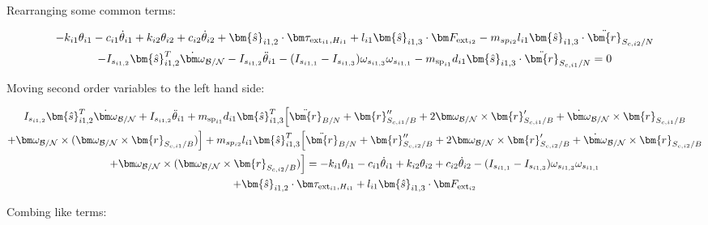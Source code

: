 Rearranging some common terms:

\begin{multline}
	-k_{i1} \theta_{i1} - c_{i1} \dot{\theta}_{i1} + k_{i2} \theta_{i2} + c_{i2} \dot{\theta}_{i2} + \bm{\hat{s}}_{i1,2} \cdot \bm \tau_{\text{ext}_{i1},H_{i1}}  + l_{i1} \bm{\hat{s}}_{i1,3} \cdot \bm F_{\text{ext}_{i2}}  - m_{sp_{i2}} l_{i1} \bm{\hat{s}}_{i1,3} \cdot \ddot{\bm{r}}_{S_{c,i2}/N} \\
	- I_{s_{i1,2}} \bm{\hat{s}}_{i1,2}^T \dot{\bm \omega}_{\cal{B/N}} - I_{s_{i1,2}} \ddot{\theta}_{i1} - (I_{s_{i1,1}} - I_{s_{i1,3}}) \omega_{s_{i1,3}} \omega_{s_{i1,1}} -m_{\text{sp}_{i1}} d_{i1} \bm{\hat{s}}_{i1,3} \cdot \ddot{\bm{r}}_{S_{c,i1}/N} = 0
\end{multline}

Moving second order variables to the left hand side:

\begin{multline}
	I_{s_{i1,2}} \bm{\hat{s}}_{i1,2}^T \dot{\bm \omega}_{\cal{B/N}} + I_{s_{i1,2}} \ddot{\theta}_{i1} + m_{\text{sp}_{i1}} d_{i1} \bm{\hat{s}}_{i1,3}^T \Big[\ddot{\bm{r}}_{B/N} + \bm{r}''_{S_{c,i1}/B} + 2 \bm\omega_{\cal B/N} \times \bm{r}'_{S_{c,i1}/B} +  \dot{\bm\omega}_{\cal B/N} \times \bm{r}_{S_{c,i1}/B} \\
	+ \bm\omega_{\cal B/N} \times (\bm\omega_{\cal B/N} \times \bm{r}_{S_{c,i1}/B})\Big] + m_{sp_{i2}} l_{i1} \bm{\hat{s}}_{i1,3}^T \Big[\ddot{\bm{r}}_{B/N} + \bm{r}''_{S_{c,i2}/B} + 2 \bm\omega_{\cal B/N} \times \bm{r}'_{S_{c,i2}/B} +  \dot{\bm\omega}_{\cal B/N} \times \bm{r}_{S_{c,i2}/B} \\
	+ \bm\omega_{\cal B/N} \times (\bm\omega_{\cal B/N} \times \bm{r}_{S_{c,i2}/B})\Big]
	= -k_{i1} \theta_{i1} - c_{i1} \dot{\theta}_{i1} + k_{i2} \theta_{i2} + c_{i2} \dot{\theta}_{i2} - (I_{s_{i1,1}} - I_{s_{i1,3}}) \omega_{s_{i1,3}} \omega_{s_{i1,1}} \\
	+ \bm{\hat{s}}_{i1,2} \cdot \bm \tau_{\text{ext}_{i1},H_{i1}}
	+ l_{i1} \bm{\hat{s}}_{i1,3} \cdot \bm F_{\text{ext}_{i2}}
\end{multline}

Combing like terms:

